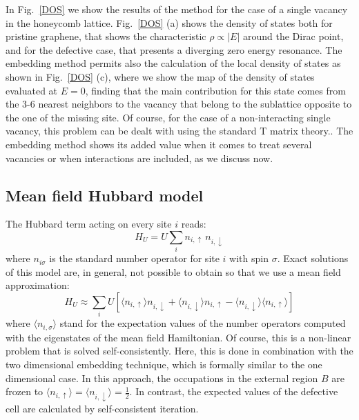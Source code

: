 In Fig.~\ref{DOS} we show the results of the method for the case of a single vacancy in the honeycomb lattice. Fig.~\ref{DOS} (a) shows the density of states both for pristine graphene, that shows the characteristic $\rho \propto |E|$ around the Dirac point,\cite{Katsnelson2012} and for the defective case, that presents a diverging zero energy resonance. The embedding method permits also the calculation of the local density of states as shown in Fig.~\ref{DOS} (c), where we show the map of the density of states evaluated at $E=0$, finding that the main contribution for this state comes from the 3-6 nearest neighbors to the vacancy that belong to the sublattice opposite to the one of the missing site.\cite{Pereira2006,Kumazaki2007,Wehling2007,Pereira2008,Palacios2008}
Of course, for the case of a non-interacting single vacancy, this problem can be dealt with using the standard T matrix theory.\cite{Economou2006,Gonzalez2012,Wehling2007}. The embedding method shows its added value when it comes to treat several vacancies or when interactions are included, as we discuss now.


\subsection{Mean field Hubbard model }
The Hubbard term acting on every site $i$ reads:
\begin{equation}
  H_{U} = U \sum_i n_{i,\uparrow}\,n_{i,\downarrow}
\end{equation}
where $n_{i\sigma}$ is the standard number operator for site $i$ with spin $\sigma$.
Exact solutions of this model are, in general, not possible to obtain so that we use a mean field approximation:
\begin{equation}
  H_{U} \approx \sum_i
  U \left[\langle n_{i,\uparrow} \rangle n_{i,\downarrow} +
    \langle n_{i,\downarrow} \rangle n_{i,\uparrow}  -
    \langle n_{i,\downarrow} \rangle \langle n_{i,\uparrow} \rangle
  \right]
\end{equation}
where $\langle n_{i,\sigma} \rangle$ stand for the expectation values of the number operators computed with the eigenstates of the mean field Hamiltonian.
Of course, this is a non-linear problem that is solved self-consistently.  Here, this is done in combination with the two dimensional embedding technique, which is formally similar to the one dimensional case.\cite{Munoz2009}
In this approach, the occupations in the external region $B$ are frozen to $\langle n_{i,\uparrow}\rangle= \langle n_{i,\downarrow}\rangle=\frac{1}{2}$.  In contrast, the expected values of the defective cell are calculated by self-consistent iteration.


